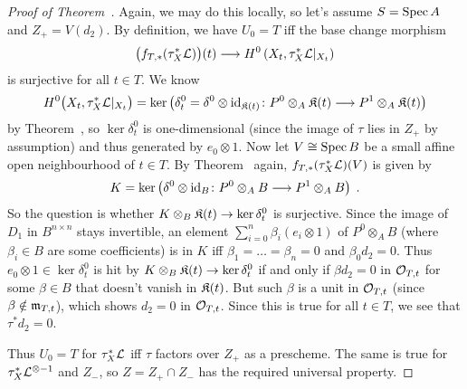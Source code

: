 \documentclass[a4paper,parskip=half,numbers=enddot, DIV=12]{scrreprt}
\begin{document}
\begin{proof}[Proof of Theorem~]
	Again, we may do this locally, so let's assume $S=\operatorname{Spec} A$ and $Z_+=V(d_2)$. By definition, we have $U_0=T$ iff the base change morphism
	\begin{align*}
		\big(f_{T,*}(\tau_X^*\Ll)\big)(t)\morphism H^0\left(X_t,\tau_X^*\Ll|_{X_t}\right)
	\end{align*}
	is surjective for all $t\in T$. We know 
	\begin{align*}
		H^0\big(X_t,\tau_X^*\Ll|_{X_t}\big)=\ker\left(\delta_t^0=\delta^0\otimes\id_{\KK(t)}\colon P^0\otimes_A\KK(t)\morphism P^1\otimes_A\KK(t)\right)
	\end{align*}
	by Theorem~, so $\ker \delta^0_t$ is one-dimensional (since the image of $\tau$ lies in $Z_+$ by assumption) and thus generated by $e_0\otimes1$. Now let $V\cong \operatorname{Spec} B$ be a small affine open neighbourhood of $t\in T$. By Theorem~ again, $f_{T,*}(\tau_X^*\mathcal{L})(V)$ is given by
	\begin{align*}
		K=\ker\left(\delta^0\otimes\id_B\colon P^0\otimes_AB\morphism P^1\otimes_AB\right)\;.
	\end{align*}
	So the question is whether $K\otimes_B\KK(t)\morphism \ker\delta_t^0$ is surjective. Since the image of $D_1$ in $B^{n\times n}$ stays invertible, an element $\sum_{i=0}^n\beta_i(e_i\otimes1)$ of $P^0\otimes_AB$ (where $\beta_i\in B$ are some coefficients) is in $K$ iff $\beta_1=\ldots=\beta_n=0$ and $\beta_0d_2=0$. Thus $e_0\otimes1\in\ker\delta_t^0$ is hit by $K\otimes_B\KK(t)\morphism \ker\delta_t^0$ if and only if $\beta d_2=0$ in $\mathcal{O}_{T,t}$ for some $\beta\in B$ that doesn't vanish in $\mathfrak{K}(t)$. But such $\beta$ is a unit in $\mathcal{O}_{T,t}$ (since $\beta\notin\mathfrak{m}_{T,t}$), which shows $d_2=0$ in $\mathcal{O}_{T,t}$. Since this is true for all $t\in T$, we see that $\tau^*d_2=0$.
	
	Thus $U_0=T$ for $\tau_X ^*\mathcal{L}$ iff $\tau$ factors over $Z_+$ as a prescheme. The same is true for $\tau_X^*\mathcal{L}^{\otimes -1}$ and $Z_-$, so $Z=Z_+\cap Z_-$ has the required universal property.
\end{proof}
\end{document}
